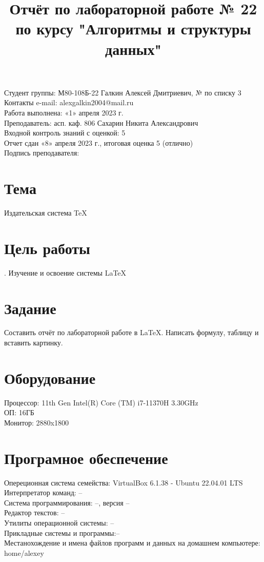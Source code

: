 \documentclass{article}
\title{Отчёт по лабораторной работе № 22 по курсу "Алгоритмы и структуры данных"}
\author{}
\begin{document}
\maketitle
\raggedright
Студент группы: М80-108Б-22 Галкин Алексей Дмитриевич, № по списку 3 \\
Контакты e-mail: alexgalkin2004@mail.ru \\
Работа выполнена: «1» апреля 2023 г. \\
Преподаватель: асп. каф. 806 Сахарин Никита Александрович \\
Входной контроль знаний с оценкой: 5 \\
Отчет сдан «8» апреля 2023  г., итоговая оценка 5 (отлично) \\
Подпись преподавателя:  \underline{\hspace{3cm}} \\


\section{Тема}
Издательская система \TeX

\section{Цель работы}.
Изучение и освоение системы \LaTeX

\section{Задание}
Составить отчёт по лабораторной работе в \LaTeX. Написать формулу, таблицу и вставить картинку.

\section{Оборудование}
Процессор: 11th Gen Intel(R) Core (TM) i7-11370H 3.30GHz \\
ОП: 16ГБ \\
Монитор: 2880x1800 \\
\section{Програмное обеспечение}
Опереционная система семейства: VirtualBox 6.1.38 - Ubuntu 22.04.01 LTS \\
Интерпретатор команд: -- \\ 
Система программирования: --, версия --  \\
Редактор текстов: -- \\
Утилиты операционной системы: -- \\
Прикладные системы и программы:-- \\
Местанохождение и имена файлов программ и данных на домашнем компьютере: home/alexey \\
\end{document}
